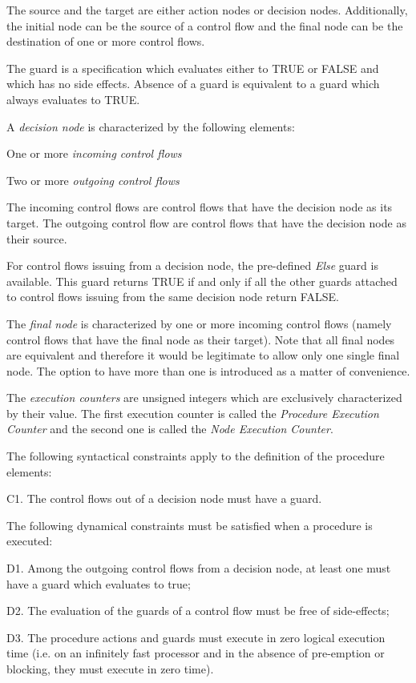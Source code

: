 The source and the target are either action nodes or decision nodes. Additionally, the initial
node can be the source of a control flow and the final node can be the destination of one or
more control flows.

The guard is a specification which evaluates either to TRUE or FALSE and which
has no side effects. Absence of a guard is equivalent to a guard which always evaluates to TRUE.

A \emph{decision node} is characterized by the following elements:
\begin{fw_itemize}
\item One or more \emph{incoming control flows}
\item Two or more \emph{outgoing control flows}
\end{fw_itemize}

The incoming control flows are control flows that have the decision node as its target. The
outgoing control flow are control flows that have the decision node as their source.

For control flows issuing from a decision node, the pre-defined \textit{Else} guard is available. This
guard returns TRUE if and only if all the other guards attached to control flows issuing from
the same decision node return FALSE.

The \emph{final node} is characterized by one or more incoming control flows (namely control flows
that have the final node as their target). Note that all final nodes are equivalent and therefore it
would be legitimate to allow only one single final node. The option to have more than one is
introduced as a matter of convenience.

The \emph{execution counters} are unsigned integers which are exclusively characterized by their value.
The first execution counter is called the \emph{Procedure Execution Counter} and the second one
is called the \emph{Node Execution Counter}.

The following syntactical constraints apply to the definition of the procedure elements:

\begin{fw_itemize}
\item C1. The control flows out of a decision node must have a guard.
\end{fw_itemize}

The following dynamical constraints must be satisfied when a procedure is executed:
\begin{fw_itemize}
\item D1. Among the outgoing control flows from a decision node, at least one must have a
guard which evaluates to true;
\item D2. The evaluation of the guards of a control flow must be free of side-effects;
\item D3. The procedure actions and guards must execute in zero logical execution time
(i.e. on an infinitely fast processor and in the absence of pre-emption or blocking, 
they must execute in zero time).
\end{fw_itemize}

